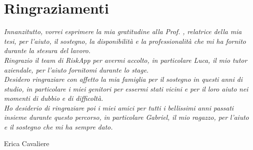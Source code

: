 \cleardoublepage
{}
{}



\bigskip

\begingroup
\let\clearpage\relax
\let\cleardoublepage\relax
\let\cleardoublepage\relax

\chapter*{Ringraziamenti}

\noindent \textit{Innanzitutto, vorrei esprimere la mia gratitudine alla Prof. \myProf, relatrice della mia tesi, per l'aiuto, il sostegno, la disponibilità e la professionalità che mi ha fornito durante la stesura del lavoro.}\\

\noindent \textit{Ringrazio il team di RiskApp per avermi accolto, in particolare Luca, il mio tutor aziendale, per l'aiuto fornitomi durante lo stage.}\\


\noindent \textit{Desidero ringraziare con affetto la mia famiglia per il sostegno in questi anni di studio, in particolare i miei genitori per essermi stati vicini e per il loro aiuto nei momenti di dubbio e di difficoltà.}\\

\noindent \textit{Ho desiderio di ringraziare poi i miei amici per tutti i bellissimi anni passati insieme durante questo percorso, in particolare Gabriel, il mio ragazzo, per l'aiuto e il sostegno che mi ha sempre dato.}\\
\bigskip

\noindent {\myLocation, \myTime}
\hfill Erica Cavaliere

\endgroup
